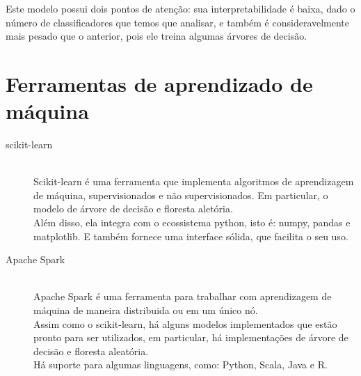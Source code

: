 \begin{description}
    Este modelo possui dois pontos de atenção: sua interpretabilidade é baixa, dado o número de classificadores que temos que analisar, e também é consideravelmente mais pesado que o anterior, pois ele treina algumas árvores de decisão.
\end{description}

\section{Ferramentas de aprendizado de máquina}

\begin{description}
    \item[scikit-learn] \hfill \\ Scikit-learn é uma ferramenta que implementa algoritmos de aprendizagem de máquina, supervisionados e não supervisionados. Em particular, o modelo de árvore de decisão e floresta aletória.\\ 
    Além disso, ela integra com o ecossistema python, isto é: numpy, pandas e matplotlib. E também fornece uma interface sólida, que facilita o seu uso. 

    \item[Apache Spark] \hfill \\ Apache Spark é uma ferramenta para trabalhar com aprendizagem de máquina de maneira distribuida ou em um único nó. \\
    Assim como o scikit-learn, há alguns modelos implementados que estão pronto para ser utilizados, em particular, há implementações de árvore de decisão e floresta aleatória. \\
    Há suporte para algumas linguagens, como: Python, Scala, Java e R.
\end{description}